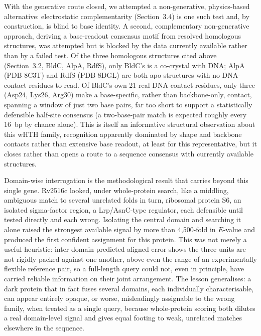 \documentclass[11pt,a4paper]{article}
\begin{document}
With the generative route closed, we attempted a non-generative, physics-based alternative:
electrostatic complementarity (Section~3.4) is one such test and, by construction, is blind to base
identity. A second, complementary non-generative approach, deriving a base-readout consensus motif
from resolved homologous structures, was attempted but is blocked by the data currently available
rather than by a failed test. Of the three homologous structures cited above (Section~3.2, BldC,
AlpA, RdfS), only BldC's is a co-crystal with DNA; AlpA (PDB 8C3T) and RdfS (PDB 8DGL) are both apo
structures with no DNA-contact residues to read. Of BldC's own 21 real DNA-contact residues, only
three (Asp24, Lys26, Arg30) make a base-specific, rather than backbone-only, contact, spanning a
window of just two base pairs, far too short to support a statistically defensible half-site
consensus (a two-base-pair match is expected roughly every 16~bp by chance alone). This is itself an
informative structural observation about this wHTH family, recognition apparently dominated by
shape and backbone contacts rather than extensive base readout, at least for this representative,
but it closes rather than opens a route to a sequence consensus with currently available structures.

Domain-wise interrogation is the methodological result that carries beyond this single gene.
Rv2516c looked, under whole-protein search, like a middling, ambiguous match to several unrelated
folds in turn, ribosomal protein S6, an isolated sigma-factor region, a Lrp/AsnC-type regulator,
each defensible until tested directly and each wrong. Isolating the central domain and searching it
alone raised the strongest available signal by more than 4{,}500-fold in $E$-value and produced the
first confident assignment for this protein. This was not merely a useful heuristic: inter-domain
predicted aligned error shows the three units are not rigidly packed against one another, above even
the range of an experimentally flexible reference pair, so a full-length query could not, even in
principle, have carried reliable information on their joint arrangement. The lesson generalises: a
dark protein that in fact
fuses several domains, each individually characterisable, can appear entirely opaque, or worse,
misleadingly assignable to the wrong family, when treated as a single query, because whole-protein
scoring both dilutes a real domain-level signal and gives equal footing to weak, unrelated matches
elsewhere in the sequence.
\end{document}
